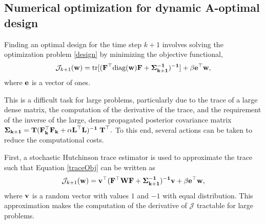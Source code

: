 \documentclass[12pt]{article}
\newcommand {\bfv}   { {\bf v} }
\newcommand {\bfe}   { {\bf e} }
\newcommand {\bfw}   { {\bf w} }
\newcommand {\bfF}  { {\bf F} }
\newcommand{\bT}  {\text{\bf T}} %
\newcommand{\bfL}  {\text{{\bf L}}} %
\newcommand{\JJ}  {\mathcal{J}}    %
\newcommand{\W}{\text{\bf W}}
\newcommand{\Sigh}{\bf \Sigma}
\begin{document}
\subsection{Numerical optimization for dynamic A-optimal design}
Finding an optimal design for the time step $k+1$ involves solving the optimization problem \ref{design} by minimizing the objective functional,
\begin{equation}
\label{traceObj}
\JJ_{k+1}(\bfw) = \text{tr}[(\bfF^{\top} \text{diag}(\bfw) \bfF + \Sigh_{k+1}^{-1})^{-1}] + \beta \bfe^{\top}\bfw,
\end{equation}
where $\bfe$ is a vector of ones.

This is a difficult task for large problems, particularly due to the trace of a large dense matrix, the computation of the derivative of the trace, and the requirement of the inverse of the large, dense propagated posterior covariance matrix $\Sigh_{k+1} = {\bT}(\bfF_k^{\top} \bfF_k +\alpha \bfL^{\top} \bfL)^{-1}\;{\bT}^{\top}.$ To this end, several actions can be taken to reduce the computational costs.

First, a stochastic Hutchinson trace estimator is used to approximate the trace  \cite{Hutchinson1989,habera} such that Equation \eqref{traceObj} can be written as
\begin{equation}
\label{Obj}
\JJ_{k+1}(\bfw) = \bfv^{\top}(\bfF^{\top} \W \bfF + \Sigh_{k+1}^{-1})^{-1}\bfv + \beta \bfe^{\top}\bfw,
\end{equation}
where $\bfv$ is a random vector with values $1$ and $-1$ with equal distribution. This approximation makes the computation of the derivative of $\JJ$ tractable for large problems. \\
\end{document}
